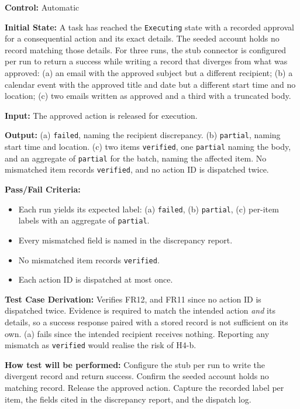 \documentclass[12pt, titlepage]{article}
\begin{document}
\begin{enumerate}
\textbf{Control:} Automatic

\textbf{Initial State:} A task has reached the \texttt{Executing} state with a recorded approval for a consequential action and its exact details.
The seeded account holds no record matching those details. For three runs, the stub connector is configured per run to return a success while writing a record
that diverges from what was approved: (a) an email with the approved subject but a different recipient; (b) a calendar event with the approved title and date but a different
start time and no location; (c) two emails written as approved and a third with a truncated body.

\textbf{Input:} The approved action is released for execution.

\textbf{Output:} (a) \texttt{failed}, naming the recipient discrepancy. (b) \texttt{partial}, naming start time and location. (c) two items \texttt{verified}, one \texttt{partial} 
naming the body, and an aggregate of \texttt{partial} for the batch, naming the affected item. No mismatched item records \texttt{verified}, and no action ID is dispatched twice.

\textbf{Pass/Fail Criteria:}
\begin{itemize}
  \item Each run yields its expected label: (a) \texttt{failed}, (b) \texttt{partial}, (c) per-item labels with an aggregate of \texttt{partial}.
  \item Every mismatched field is named in the discrepancy report.
  \item No mismatched item records \texttt{verified}.
  \item Each action ID is dispatched at most once.
\end{itemize}

\textbf{Test Case Derivation:} Verifies FR12, and FR11 since no action ID is dispatched twice. Evidence is required to match the intended action \emph{and} its details, so a success response paired with a stored record is not
sufficient on its own. (a) fails since the intended recipient receives nothing. Reporting any mismatch as \texttt{verified} would realise the risk of H4-b.

\textbf{How test will be performed:} Configure the stub per run to write the divergent record and return success. Confirm the seeded account holds no matching record. Release the approved action. Capture the recorded label per item, 
the fields cited in the discrepancy report, and the dispatch log.




\end{enumerate}
\end{document}

